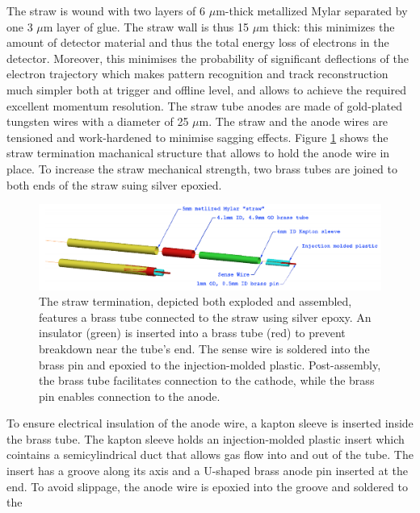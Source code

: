 The straw is wound with two layers of 6 $\mu$m-thick metallized 
Mylar separated by one 3 $\mu$m layer of glue. The straw wall is thus 15 $\mu$m thick: 
this minimizes the amount of detector material and thus the total energy 
loss of electrons in the detector. Moreover, this minimises the probability 
of significant deflections of the electron trajectory which makes pattern 
recognition and track reconstruction much simpler both at trigger 
and offline level, and allows to achieve the required excellent momentum 
resolution. The straw tube anodes are made of gold-plated tungsten wires with 
a diameter of 25 $\mu$m. The straw and the anode wires are tensioned 
and work-hardened to minimise sagging effects.
Figure \ref{fig:trktubessmon} shows the straw termination machanical 
structure that allows to hold the anode wire in place.
To increase the straw mechanical strength, two brass tubes 
are joined to both ends of the straw suing silver epoxied.
    \begin{figure}[!h]
        \centering
        \includegraphics[width =\textwidth]{figures/png/Screenshot_20240706_153158.png}
        \caption[The straw termination.]{The straw termination, depicted both exploded and assembled, 
        features a brass tube connected to the straw using silver epoxy. 
        An insulator (green) is inserted into a brass tube 
        (red) to prevent breakdown near the tube's end. The sense 
        wire is soldered into the brass pin and epoxied to the 
        injection-molded plastic. Post-assembly, the brass tube 
        facilitates connection to the cathode, while the brass pin 
        enables connection to the anode.}
        \label{fig:trktubessmon}
        \end{figure}
        To ensure electrical insulation of the anode wire, 
        a kapton sleeve is inserted inside the brass tube. 
        The kapton sleeve holds an injection-molded plastic 
        insert which cointains a semicylindrical duct that 
        allows gas flow into and out of the tube. The insert 
        has a groove along its axis and a U-shaped brass anode 
        pin inserted at the end. To avoid slippage, the anode 
        wire is epoxied into the groove and soldered to the 
